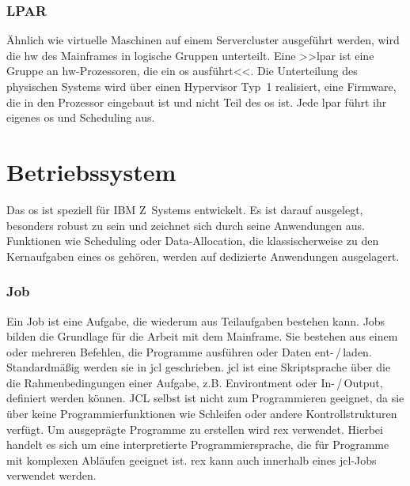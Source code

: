\subsubsection{LPAR}

Ähnlich wie virtuelle Maschinen auf einem Servercluster ausgeführt werden, wird die \ac{hw} des Mainframes in logische Gruppen unterteilt. Eine >>\ac{lpar} ist eine Gruppe an \ac{hw}-Prozessoren, die ein \ac{os} ausführt<<\cite{redbook.1}. Die Unterteilung des physischen Systems wird über einen Hypervisor Typ~1 realisiert, eine Firmware, die in den Prozessor eingebaut ist und nicht Teil des \ac{os} ist. Jede \ac{lpar} führt ihr eigenes \ac{os} und Scheduling aus.

\section[\z]{Betriebssystem \z}
Das \ac{os} \emph{\z} ist speziell für IBM Z~Systems entwickelt. Es ist darauf ausgelegt, besonders robust zu sein und zeichnet sich durch seine Anwendungen aus. Funktionen wie Scheduling oder Data-Allocation, die klassischerweise zu den Kernaufgaben eines \ac{os} gehören, werden auf dedizierte Anwendungen ausgelagert.






\subsubsection{Job}
Ein Job ist eine Aufgabe, die wiederum aus Teilaufgaben bestehen kann.  Jobs bilden die Grundlage für die Arbeit mit dem Mainframe. Sie bestehen aus einem oder mehreren Befehlen, die Programme ausführen oder Daten ent-\,/\,laden. Standardmäßig werden sie in \ac{jcl} geschrieben. \ac{jcl} ist eine Skriptsprache über die die Rahmenbedingungen einer Aufgabe, z.B. Environtment oder In-\,/\,Output, definiert werden können. JCL selbst ist nicht zum Programmieren geeignet, da sie über keine Programmierfunktionen wie Schleifen oder andere Kontrollstrukturen verfügt.
Um ausgeprägte Programme zu erstellen wird \ac{rex} verwendet. Hierbei handelt es sich um eine interpretierte Programmiersprache, die für Programme mit komplexen Abläufen geeignet ist. \ac{rex} kann auch innerhalb eines \ac{jcl}-Jobs verwendet werden.

